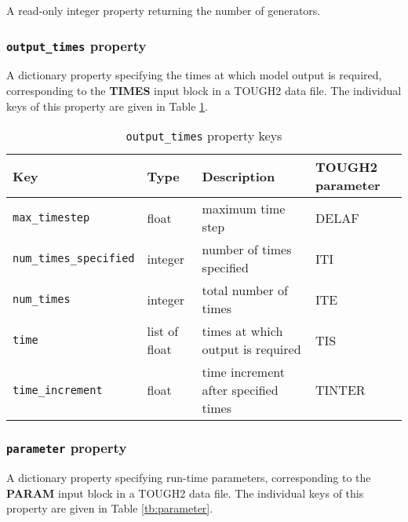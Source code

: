 A read-only integer property returning the number of generators.

\begin{snugshade}
\subsubsection{\texttt{output\_times} property}
\end{snugshade}
\label{sec:t2data:output_times}

A dictionary property specifying the times at which model output is required, corresponding to the \textbf{TIMES} input block in a TOUGH2 data file.  The individual keys of this property are given in Table \ref{tb:outputtimes}.

\begin{table}
  \begin{center}
    \begin{tabular}{|l|l|l|p{20mm}|}
      \hline
      \textbf{Key} & \textbf{Type} & \textbf{Description} & \textbf{TOUGH2 parameter}\\
      \hline
      \texttt{max\_timestep} & float & maximum time step & DELAF\\
      \texttt{num\_times\_specified} & integer & number of times specified & ITI\\
      \texttt{num\_times} & integer & total number of times & ITE\\
      \texttt{time} & list of float & times at which output is required & TIS\\
      \texttt{time\_increment} & float & time increment after specified times & TINTER\\
      \hline
    \end{tabular}
    \caption{\texttt{output\_times} property keys}
    \label{tb:outputtimes}
  \end{center}
\end{table}

\begin{snugshade}
\subsubsection{\texttt{parameter} property}
\end{snugshade}
\label{sec:t2data:parameter}

A dictionary property specifying run-time parameters, corresponding to the \textbf{PARAM} input block in a TOUGH2 data file.  The individual keys of this property are given in Table \ref{tb:parameter}.

